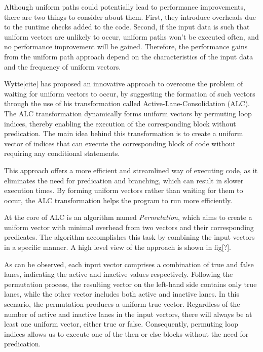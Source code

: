 \documentclass[\main/thesis.tex]{subfiles}
\begin{document}
Although uniform paths could potentially lead to performance improvements, there are two things to consider about them. First, they introduce overheads due to the runtime checks added to the code. Second, if the input data is such that uniform vectors are unlikely to occur, uniform paths won't be executed often, and no performance improvement will be gained. Therefore, the performance gains from the uniform path approach depend on the characteristics of the input data and the frequency of uniform vectors.



Wytte[cite] has proposed an innovative approach to overcome the problem of waiting for uniform vectors to occur, by suggesting the formation of such vectors through the use of his transformation called Active-Lane-Consolidation (ALC). The ALC transformation dynamically forms uniform vectors by permuting loop indices, thereby enabling the execution of the corresponding block without predication. The main idea behind this transformation is to create a uniform vector of indices that can execute the corresponding block of code without requiring any conditional statements.

This approach offers a more efficient and streamlined way of executing code, as it eliminates the need for predication and branching, which can result in slower execution times. By forming uniform vectors rather than waiting for them to occur, the ALC transformation helps the program to run more efficiently.

At the core of ALC is an algorithm named \emph{Permutation}, which aims to create a uniform vector with minimal overhead from two vectors and their corresponding predicates. The algorithm accomplishes this task by combining the input vectors in a specific manner. A high level view of the approach is shown in fig[?].

As can be observed, each input vector comprises a combination of true and false lanes, indicating the active and inactive values respectively. Following the permutation process, the resulting vector on the left-hand side contains only true lanes, while the other vector includes both active and inactive lanes. In this scenario, the permutation produces a uniform true vector. Regardless of the number of active and inactive lanes in the input vectors, there will always be at least one uniform vector, either true or false. Consequently, permuting loop indices allows us to execute one of the then or else blocks without the need for predication.
\end{document}
